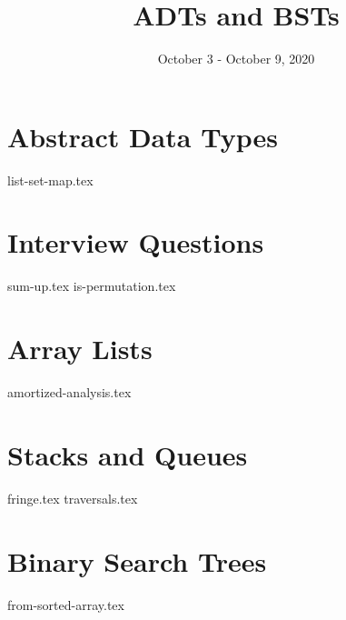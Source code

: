 \documentclass[11pt]{exam}
\title{ADTs and BSTs}
\date{October 3 - October 9, 2020}
\begin{document}
\section{Abstract Data Types}
{list-set-map.tex}
\clearpage

\section{Interview Questions}
\begin{questions}
{sum-up.tex}
{is-permutation.tex}
\end{questions}
\clearpage

\section{Array Lists}
\begin{questions}
{amortized-analysis.tex}
\end{questions}
\clearpage

\section{Stacks and Queues}
\begin{questions}
{fringe.tex}
{traversals.tex}
\end{questions}
\clearpage

\section{Binary Search Trees}
\begin{questions}
{from-sorted-array.tex}
\end{questions}
\clearpage
\end{document}
